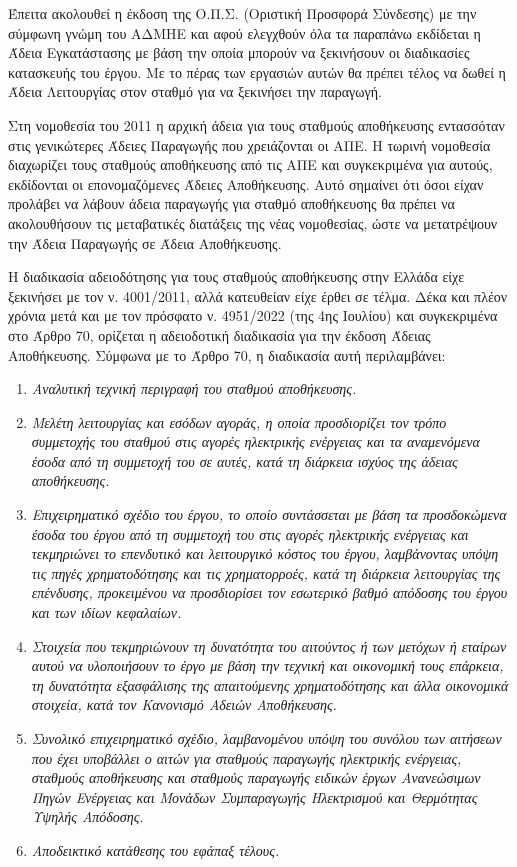 \documentclass[12pt]{report}
\begin{document}
Έπειτα ακολουθεί η έκδοση της Ο.Π.Σ. (Οριστική Προσφορά Σύνδεσης) με την σύμφωνη γνώμη του ΑΔΜΗΕ και αφού ελεγχθούν όλα τα παραπάνω εκδίδεται η Άδεια Εγκατάστασης με βάση την οποία μπορούν να ξεκινήσουν οι διαδικασίες
κατασκευής του έργου. Με το πέρας των εργασιών αυτών θα πρέπει τέλος να δωθεί η Άδεια Λειτουργίας στον σταθμό για να ξεκινήσει την παραγωγή.

Στη νομοθεσία του 2011 η αρχική άδεια για τους σταθμούς αποθήκευσης εντασσόταν στις γενικώτερες Άδειες Παραγωγής που χρειάζονται οι ΑΠΕ. Η τωρινή νομοθεσία διαχωρίζει τους σταθμούς αποθήκευσης από τις ΑΠΕ και συγκεκριμένα 
για αυτούς, εκδίδονται οι επονομαζόμενες Άδειες Αποθήκευσης. Αυτό σημαίνει ότι όσοι είχαν προλάβει να λάβουν άδεια παραγωγής για σταθμό αποθήκευσης θα πρέπει να ακολουθήσουν τις μεταβατικές διατάξεις της νέας νομοθεσίας, 
ώστε να μετατρέψουν την Άδεια Παραγωγής σε Άδεια Αποθήκευσης.

Η διαδικασία αδειοδότησης για τους σταθμούς αποθήκευσης στην Ελλάδα είχε ξεκινήσει με τον ν. 4001/2011, αλλά κατευθείαν είχε έρθει σε τέλμα. Δέκα και πλέον χρόνια μετά και με τον πρόσφατο ν. 4951/2022 (της 4ης Ιουλίου) και 
συγκεκριμένα στο Άρθρο 70, ορίζεται η αδειοδοτική διαδικασία για την έκδοση Άδειας Αποθήκευσης. Σύμφωνα με το Άρθρο 70, η διαδικασία αυτή περιλαμβάνει:

\begin{enumerate}[label=\roman*.]
	\item {\textit{Αναλυτική τεχνική περιγραφή του σταθμού αποθήκευσης.}}
	\item {\textit{Μελέτη λειτουργίας και εσόδων αγοράς, η οποία προσδιορίζει τον τρόπο συμμετοχής του σταθμού στις αγορές ηλεκτρικής ενέργειας και τα αναμενόμενα έσοδα από τη συμμετοχή του σε αυτές, 
				κατά τη διάρκεια ισχύος της άδειας αποθήκευσης.}}
	\item {\textit{Επιχειρηματικό σχέδιο του έργου, το οποίο συντάσσεται με βάση τα προσδοκώμενα έσοδα του έργου από τη συμμετοχή του στις αγορές ηλεκτρικής ενέργειας και τεκμηριώνει το επενδυτικό και λειτουργικό κόστος του έργου, 
				λαμβάνοντας υπόψη τις πηγές χρηματοδότησης και τις χρηματορροές, κατά τη διάρκεια λειτουργίας της επένδυσης, προκειμένου να προσδιορίσει τον εσωτερικό βαθμό απόδοσης του έργου και των ιδίων κεφαλαίων.}}
	\item {\textit{Στοιχεία που τεκμηριώνουν τη δυνατότητα του αιτούντος ή των μετόχων ή εταίρων αυτού να υλοποιήσουν το έργο με βάση την τεχνική και οικονομική τους επάρκεια, τη δυνατότητα εξασφάλισης της απαιτούμενης χρηματοδότησης 
				και άλλα οικονομικά στοιχεία, κατά τον Κανονισμό Αδειών Αποθήκευσης.}}
	\item {\textit{Συνολικό επιχειρηματικό σχέδιο, λαμβανομένου υπόψη του συνόλου των αιτήσεων που έχει υποβάλλει ο αιτών για σταθμούς παραγωγής ηλεκτρικής ενέργειας, σταθμούς αποθήκευσης και σταθμούς παραγωγής ειδικών έργων 
				Ανανεώσιμων Πηγών Ενέργειας και Μονάδων Συμπαραγωγής Ηλεκτρισμού και Θερμότητας Υψηλής Απόδοσης.}}
	\item {\textit{Αποδεικτικό κατάθεσης του εφάπαξ τέλους.}}
\end{enumerate}
\end{document}

